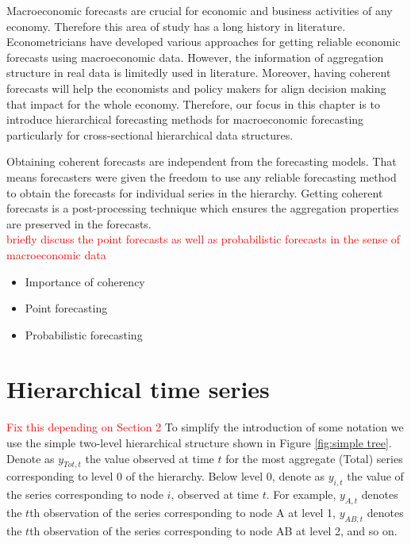 \documentclass[graybox]{svmult}
\begin{document}
Macroeconomic forecasts are crucial for economic and business activities of any economy. Therefore this area of study has a long history in literature. Econometricians have developed various approaches for getting reliable economic forecasts using macroeconomic data. However, the information of aggregation structure in real data is limitedly used in literature. Moreover, having coherent forecasts will help the economists and policy makers for align decision making that impact for the whole economy. Therefore, our focus in this chapter is to introduce hierarchical forecasting methods for macroeconomic forecasting particularly for cross-sectional hierarchical data structures.

Obtaining coherent forecasts are independent from the forecasting models. That means forecasters were given the freedom to use any reliable forecasting method to obtain the forecasts for individual series in the hierarchy. Getting coherent forecasts is a post-processing technique which ensures the aggregation properties are preserved in the forecasts.   \\


\textcolor{red}{briefly discuss the point forecasts as well as probabilistic forecasts in the sense of macroeconomic data  }

\begin{itemize}
	\item Importance of coherency
	\item Point forecasting
	\item Probabilistic forecasting
\end{itemize}
\clearpage
\section{Hierarchical time series}\label{sec:Hier ts}

\textcolor{red}{Fix this depending on Section 2} To simplify the introduction of some notation we use the simple two-level hierarchical structure shown in Figure \ref{fig:simple tree}. Denote as $y_{Tot,t}$ the value observed at time $t$ for the most aggregate (Total) series  corresponding to level 0 of the hierarchy. Below level 0, denote as $y_{i,t}$ the value of the series corresponding to node $i$, observed at time $t$. For example, $y_{A,t}$ denotes the $t$th observation of the series corresponding to node A at level 1, $y_{AB,t}$ denotes the $t$th observation of the series corresponding to node AB at level 2, and so on.
\end{document}
